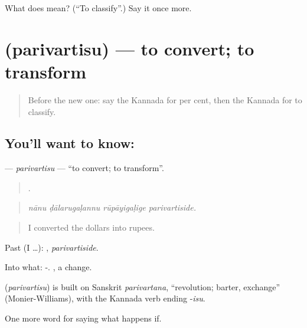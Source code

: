 \begin{tcolorbox}[breakable,colback=teal!4,colframe=teal!35!black,title={Before you move on}]
What does  mean? (\textquotedblleft{}To classify\textquotedblright{}.) Say it once more.
\end{tcolorbox}
\section[\texorpdfstring{\kn{ಪರಿವರ್ತಿಸು} (parivartisu)}{ಪರಿವರ್ತಿಸು (parivartisu)}]{ (parivartisu) — to convert; to transform}

\label{lesson:KA-C427-parivartisu}



\begin{quote}
Before the new one: say the Kannada for per cent, then the Kannada for to classify.
\end{quote}

\subsection*{You'll want to know: }
\textbf{} — \emph{parivartisu} — \textquotedblleft{}to convert; to transform\textquotedblright{}.

\begin{quote}
   .
\end{quote}

\begin{quote}
\emph{nānu ḍālarugaḷannu rūpāyigaḷige parivartiside.}
\end{quote}

\begin{quote}
I converted the dollars into rupees.
\end{quote}

Past (I …): , \emph{parivartiside}.

Into what: -. , a change.

\begin{cousinweb}
\textbf{} (\emph{parivartisu}) is built on Sanskrit \emph{parivartana}, \textquotedblleft{}revolution; barter, exchange\textquotedblright{} (Monier-Williams), with the Kannada verb ending -\emph{isu}.
\end{cousinweb}

\begin{grammarlens}[title={What you've built}]
One more word for saying what happens if.
\end{grammarlens}

